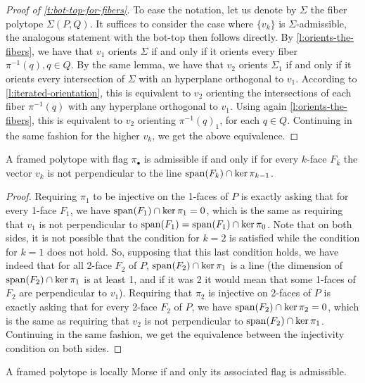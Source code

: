\begin{proof}[Proof of \cref{t:bot-top-for-fibers}]
	To ease the notation, let us denote by $\Sigma$ the fiber polytope $\Sigma(P,Q)$.
	It suffices to consider the case where $\{v_k\}$ is $\Sigma$-admissible, the analogous statement with the bot-top then follows directly.
	By \cref{l:orients-the-fibers}, we have that $v_1$ orients $\Sigma$ if and only if it orients every fiber $\pi^{-1}(q), q \in Q$.
	By the same lemma, we have that $v_2$ orients $\Sigma_1$ if and only if it orients every intersection of $\Sigma$ with an hyperplane orthogonal to $v_1$.
	According to \cref{l:iterated-orientation}, this is equivalent to $v_2$ orienting the intersections of each fiber $\pi^{-1}(q)$ with any hyperplane orthogonal to $v_1$.
	Using again \cref{l:orients-the-fibers}, this is equivalent to $v_2$ orienting $\pi^{-1}(q)_1$, for each $q \in Q$.
	Continuing in the same fashion for the higher $v_k$, we get the above equivalence.
\end{proof}

\begin{lemma} \label{l:P-admissible}
	A framed polytope with flag $\pi_\bullet$ is admissible if and only if for every $k$-face $F_k$ the vector $v_k$ is not perpendicular to the line $\operatorname{\mathrm{span}}(F_k) \cap \ker \pi_{k-1}$.
\end{lemma}

\begin{proof}
	Requiring $\pi_1$ to be injective on the 1-faces of $P$ is exactly asking that for every 1-face $F_1$, we have $\operatorname{\mathrm{span}}(F_1)\cap \ker \pi_1=0$, which is the same as requiring that $v_1$ is not perpendicular to $\operatorname{\mathrm{span}}(F_1)=\operatorname{\mathrm{span}}(F_1)\cap \ker \pi_0$.
	Note that on both sides, it is not possible that the condition for $k=2$ is satisfied while the condition for $k=1$ does not hold.
	So, supposing that this last condition holds, we have indeed that for all 2-face $F_2$ of $P$, $\operatorname{\mathrm{span}}(F_2)\cap \ker \pi_1$ is a line (the dimension of $\operatorname{\mathrm{span}}(F_2)\cap \ker \pi_1$ is at least 1, and if it was 2 it would mean that some 1-faces of $F_2$ are perpendicular to $v_1$).
	Requiring that $\pi_2$ is injective on 2-faces of $P$ is exactly asking that for every 2-face $F_2$ of $P$, we have $\operatorname{\mathrm{span}}(F_2)\cap \ker \pi_2=0$, which is the same as requiring that $v_2$ is not perpendicular to $\operatorname{\mathrm{span}}(F_2)\cap \ker \pi_1$.
	Continuing in the same fashion, we get the equivalence between the injectivity condition on both sides.
\end{proof}

\begin{lemma} \label{l:bot-top-admissible}
	A framed polytope is locally Morse if and only its associated flag is admissible.
\end{lemma}

